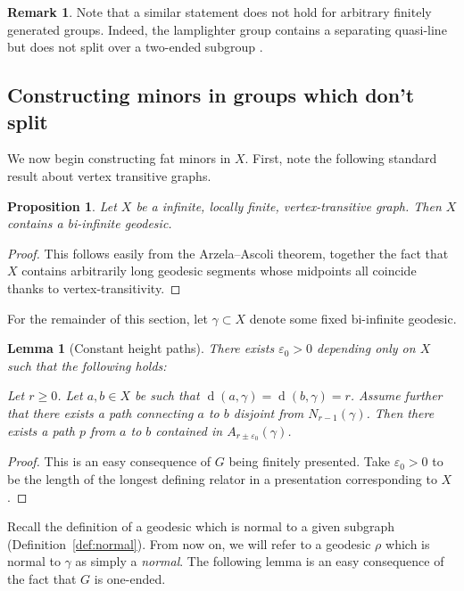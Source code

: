 \documentclass[10pt,a4paper]{amsart}
\DeclareMathOperator{\dist}{d}
\newtheorem{proposition}[theorem]{Proposition}
\newtheorem{lemma}[theorem]{Lemma}
\theoremstyle{definition}
\newtheorem{remark}[theorem]{Remark}
\begin{document}
\begin{remark}
	Note that a similar statement does not hold for arbitrary finitely generated groups. Indeed, the lamplighter group contains a separating quasi-line but does not split over a two-ended subgroup \cite{papasoglu2012splittings}. 
\end{remark}

\subsection{Constructing minors in groups which don't split}

We now begin constructing fat minors in $X$. 
First, note the following standard result about vertex transitive graphs.

\begin{proposition}
    Let $X$ be a infinite, locally finite, vertex-transitive graph. Then $X$ contains a bi-infinite geodesic. 
\end{proposition}

\begin{proof}
	This follows easily from the Arzela--Ascoli theorem, together the fact that $X$ contains arbitrarily long geodesic segments whose midpoints all coincide thanks to vertex-transitivity. 
\end{proof}

For the remainder of this section, let $\gamma \subset X$ denote some fixed bi-infinite geodesic.

\begin{lemma}[Constant height paths]\label{lem:constant-height-paths}
There exists $\varepsilon_0 > 0$ depending only on $X$ such that the following holds:   

Let $r \geq 0$. Let $a, b \in X$ be such that 
$
\dist(a, \gamma) = \dist(b, \gamma) = r 
$. 
Assume further that there exists a path connecting $a$ to $b$ disjoint from $N_{r - 1}(\gamma)$. Then there exists a path $p$ from $a$ to $b$ contained in $A_{r\pm\varepsilon_0}(\gamma)$.
\end{lemma}

\begin{proof}
    This is an easy consequence of $G$ being finitely presented. Take $\varepsilon_0 > 0$ to be the length of the longest defining relator in a presentation corresponding to $X$.
\end{proof}



Recall the definition of a geodesic which is normal to a given subgraph (Definition~\ref{def:normal}). From now on, we will refer to a geodesic $\rho$ which is normal to $\gamma$ as simply a \textit{normal}. 
The following lemma is an easy consequence of the fact that $G$ is one-ended. 
\end{document}
